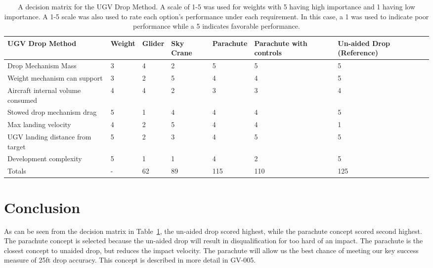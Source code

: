 \documentclass[]{auvsi_doc}
\begin{document}
\begin{table} [H]
\caption{A decision matrix for the UGV Drop Method. A scale of 1-5 was used for weights with 5 having high importance and 1 having low importance. A 1-5 scale was also used to rate each option’s performance under each requirement. In this case, a 1 was used to indicate poor performance while a 5 indicates favorable performance.}
\label{cont_cs_tab}
	\begin{tabular}{|>{\raggedright}p{2.5cm}| l | l | l | l | p{2.5cm} | p{2.5cm} |}
\hline
\rowcolor[HTML]{C0C0C0}
UGV Drop Method&Weight&Glider&Sky Crane& Parachute& Parachute with controls& Un-aided Drop (Reference) \\
\hline
Drop Mechanism Mass&                                3&4&2&5&5&5 \\
\hline
Weight mechanism can support&                       3&2&5&4&4&5 \\
\hline
Aircraft internal volume consumed&                  4&4&2&3&3&4 \\
\hline
Stowed drop mechanism drag&                         5&1&4&4&4&5 \\
\hline
Max landing velocity&                               4&2&5&4&4&1 \\
\hline
UGV landing distance from target&                   5&2&3&4&5&5 \\
\hline
Development complexity&                             5&1&1&4&2&5 \\
\hline
Totals&                                             -&62&89&115&110&125 \\
\hline

\end{tabular}
\end{table}


\section{Conclusion}
As can be seen from the decision matrix in Table~\ref{cont_cs_tab}, the un-aided drop scored highest, while the parachute concept scored second highest. The parachute concept is selected because the un-aided drop will result in disqualification for too hard of an impact. The parachute is the closest concept to unaided drop, but reduces the impact velocity. The parachute will allow us the best chance of meeting our key success measure of 25ft drop accuracy. This concept is described in more detail in GV-005.
\end{document}
